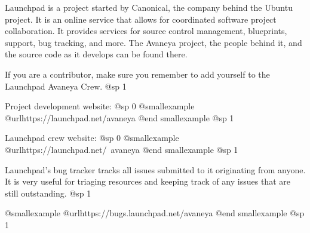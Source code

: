 
Launchpad is a project started by Canonical, the company behind the Ubuntu project. It is an online service that allows for coordinated software project collaboration. It provides services for source control management, blueprints, support, bug tracking, and more. The Avaneya project, the people behind it, and the source code as it develops can be found there.

If you are a contributor, make sure you remember to add yourself to the Launchpad Avaneya Crew.
@sp 1

Project development website:
@sp 0
@smallexample
@url{https://launchpad.net/avaneya}
@end smallexample
@sp 1

Launchpad crew website:
@sp 0
@smallexample
@url{https://launchpad.net/~avaneya}
@end smallexample
@sp 1

Launchpad's bug tracker tracks all issues submitted to it originating from anyone. It is very useful for triaging resources and keeping track of any issues that are still outstanding.
@sp 1

@smallexample
@url{https://bugs.launchpad.net/avaneya}
@end smallexample
@sp 1

